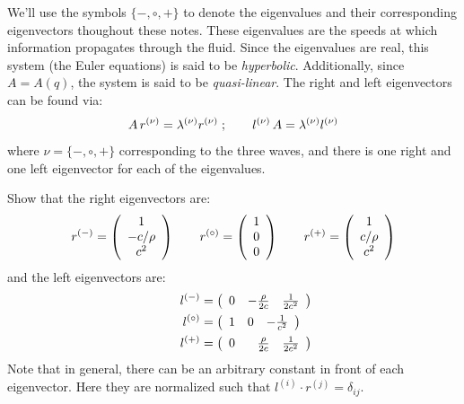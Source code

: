 We'll use the symbols $\{-,\circ,+\}$ to denote the eigenvalues and their
corresponding eigenvectors thoughout these notes.
These eigenvalues are the speeds at which information propagates through
the fluid.
Since the eigenvalues are real, this system (the Euler equations) is said
to be {\em hyperbolic}.  Additionally, since $A = A(q)$, the system is
said to be {\em quasi-linear}.  
%
The right and left eigenvectors can be found via:
\begin{equation}
A \, r^{(\nu)} = \lambda^{(\nu)} r^{(\nu)} \; ;
\qquad
l^{(\nu)} \, A  = \lambda^{(\nu)} l^{(\nu)}
\end{equation}
where $\nu = \{-,\circ,+\}$ corresponding to the three waves, and 
there is one right and one left eigenvector for each of the eigenvalues.
%
\begin{exercise}
{
Show that the right eigenvectors are:
\begin{equation}
r^\evm = \left ( \begin{array}{c} 1 \\ -c/\rho \\ c^2 \end{array} \right )
%
\qquad
r^\evz = \left ( \begin{array}{c} 1 \\ 0 \\ 0  \end{array} \right )
%
\qquad
r^\evp = \left ( \begin{array}{c} 1 \\ c/\rho \\ c^2 \end{array} \right )
\end{equation}
and the left eigenvectors are:
\begin{align}
l^\evm &= \left ( \begin{array}{ccc} 0 & -\frac{\rho}{2c} & \frac{1}{2c^2} 
                  \end{array} \right ) \\
%
\qquad
l^\evz &= \left ( \begin{array}{ccc} 1 & 0 & -\frac{1}{c^2}  \end{array} \right ) \\
%
\qquad
l^\evp &= \left ( \begin{array}{ccc} 0 & \phantom{+}\frac{\rho}{2c} & \frac{1}{2c^2} \end{array} \right )
\end{align}
Note that in general, there can be an arbitrary constant in front of each
eigenvector.  Here they are normalized such that 
$l^{(i)} \cdot r^{(j)} = \delta_{ij}$.
}
\end{exercise}

